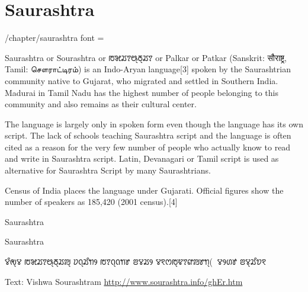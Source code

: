 \section{Saurashtra}
\newfontfamily{}
\def\test{}
\cxset{saurashtra font/.code=\test}

\begin{key}{/chapter/saurashtra font = }

\end{key}
Saurashtra or Sourashtra or {\saurashtra ꢱꣃꢬꢵꢰ꣄ꢜ꣄ꢬꢵ} or Palkar or Patkar (Sanskrit: सौराष्ट्र, Tamil: சௌராட்டிரம்) is an Indo-Aryan language[3] spoken by the Saurashtrian community native to Gujarat, who migrated and settled in Southern India. Madurai in Tamil Nadu has the highest number of people belonging to this community and also remains as their cultural center.

The language is largely only in spoken form even though the language has its own script. The lack of schools teaching Saurashtra script and the language is often cited as a reason for the very few number of people who actually know to read and write in Saurashtra script. Latin, Devanagari or Tamil script is used as alternative for Saurashtra Script by many Saurashtrians.

Census of India places the language under Gujarati. Official figures show the number of speakers as 185,420 (2001 census).[4]


\begin{scriptexample}[]{Saurashtra}
\end{scriptexample}


\begin{scriptexample}[]{Saurashtra}
\bgroup
\saurashtra

ꢮꢶꢯ꣄ꢮ ꢱꣃꢬꢵꢰ꣄ꢜ꣄ꢬꢪ꣄ ꢦꢡ꣄ꢬꢶꢒꢾ ꢱꢵꢡ꣄ꢡꢒꢸ ꢂꢮꢬꢾ
ꢮꣁꢭꢱ꣄ꢢꢵꢥꢪꢸꢒ꣄(ꣀꢵꢮꢾꢔꢹ ꢂꢮ꣄ꢬꢶꢫꣁ


\arial

Text: Vishwa Sourashtram \url{http://www.sourashtra.info/ghEr.htm}
\egroup
\end{scriptexample}


